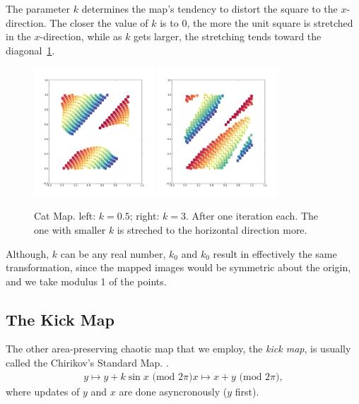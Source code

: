 \documentclass[12pt]{article}
\begin{document}
The parameter $k$ determines the map's tendency to distort the square to the $x$-direction.
The closer the value of $k$ is to $0$, the more the unit square is stretched in the $x$-direction, while as $k$ gets larger, the stretching tends toward the diagonal~\ref{fig:catmap_demo}.
\begin{figure}[t]
  \centering
  \includegraphics[width=0.4\textwidth]{catmap_05}
  \hspace{2cm}
  \includegraphics[width=0.4\textwidth]{catmap_3}
  \caption{Cat Map. left: $k=0.5$; right: $k = 3$. After one iteration each. The one with smaller $k$ is streched to the horizontal direction more.}
  \label{fig:catmap_demo}
\end{figure}

Although, $k$ can be any real number, $k_0$ and $k_0$ result in effectively the same transformation, since the mapped images would be symmetric about the origin, and we take modulus 1 of the points.

\subsection{The Kick Map}
The other area-preserving chaotic map that we employ, the \textit{kick map}, is usually called the Chirikov's Standard Map. \citep{ott}.
\begin{align*}
  y \mapsto y + k \sin x \mbox{ (mod $2\pi$)}
  x \mapsto x + y \mbox{ (mod $2\pi$)},
\end{align*}
where updates of $y$ and $x$ are done asyncronously ($y$ first).
\end{document}
